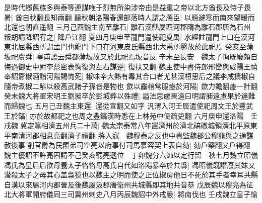 是時代鄉舊族多與泰等連謀唯于烈無所染涉帝由是益重之帝以北方酋長及侍子畏暑|{
	酋自秋翻長知兩翻}
聽秋朝洛陽春還部落時人謂之鴈臣|{
	以鴈避寒而南來望暖而北還也朝直遥翻}
三月己酉魏主南至離石|{
	離石漢縣屬西河郡隋為離石郡唐為石州}
叛胡請降詔宥之|{
	降戶江翻}
夏四月庚申至龍門遣使祀夏禹|{
	水經註龍門上口在漢河東北屈縣西所謂孟門也龍門下口在河東皮氏縣西北大禹所鑿故於此祀焉}
癸亥至蒲坂祀虞舜|{
	皇甫謐云舜都蒲坂故又於此祀焉坂音反}
辛未至長安　魏太子恂既廢頗自悔過御史中尉李彪密表恂復與左右謀逆|{
	復扶又翻}
魏主使中書侍郎邢巒與咸陽王禧奉詔齎椒酒詣河陽賜恂死|{
	椒味辛大熱有毒其合口者尤甚漢桓思后之議李咸擣椒自隨帝煮椒二斛以殺高武諸子孫皆是物也}
歛以麤棺常服瘞於河陽|{
	歛力贍翻瘞一計翻}
癸未魏大將軍宋明王劉昶卒於彭城葬以殊禮|{
	謚法思慮果遠曰明謂昶遠慮果於違難而歸魏也}
五月己丑魏主東還|{
	還從宣翻又如字}
汎渭入河壬辰遣使祀周文王於豐武王於鎬|{
	亦於故都祀之也周之豐鎬漢時悉在上林苑中使疏吏翻}
六月庚申還洛陽　壬戌魏冀定瀛相濟五州兵二十萬|{
	魏太宗泰常八年置濟州於濟北碻磝城領濟北平原東平南清河郡相息亮翻濟子禮翻}
將入寇　魏穆泰之反也中書監魏郡公穆羆與之通謀赦後事削官爵為民羆弟司空亮以府事付司馬慕容契上表自劾|{
	劾戶槩翻又戶得翻}
魏主優詔不許亮固請不己癸亥聽亮遜位　丁卯魏分六師以定行留　秋七月魏立昭儀馮氏為皇后后欲母養太子恪恪母高氏自代如洛陽暴卒於共縣|{
	馮昭儀既譛廢其妹又潜殺太子之母其心盖梟獍也以魏主之明而使之正位椒房他日不死於其手者幸耳共縣自漢以來屬河内郡晉及後魏屬汲郡唐衛州共城縣即其地共音恭}
戊辰魏以穆亮為征北大將軍開府儀同三司冀州刺史八月丙辰魏詔中外戒嚴|{
	將南伐也}
壬戌魏立皇子愉

